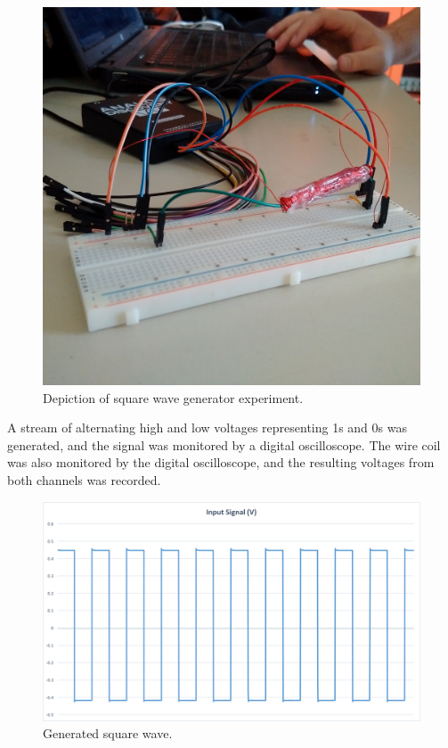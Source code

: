 \documentclass{article}
\begin{document}
\begin{figure}
	\includegraphics[width=\linewidth]{images/circuit.jpg}
	\caption{Depiction of square wave generator experiment.}
	\label{fig:squarepic}
\end{figure}

A stream of alternating high and low voltages representing 1s and 0s was generated, and the signal was monitored by a digital oscilloscope. The wire coil was also monitored by the digital oscilloscope, and the resulting voltages from both channels was recorded. 

\begin{figure}
	\includegraphics[width=\linewidth]{images/input.png}
	\caption{Generated square wave.}
	\label{fig:square_wave}
\end{figure}
\end{document}
